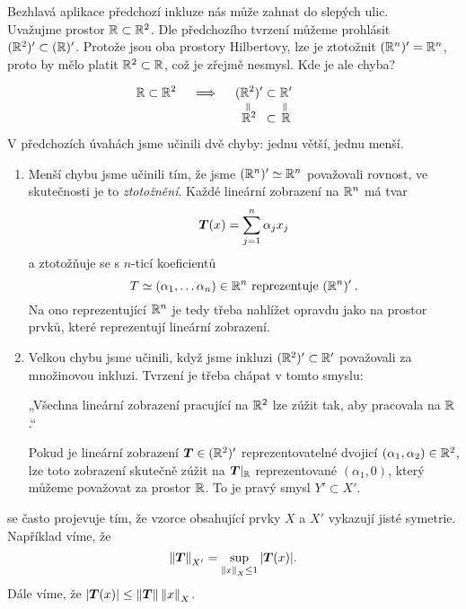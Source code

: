 \begin{example}
Bezhlavá aplikace předchozí inkluze nás může zahnat do slepých ulic.
\\
Uvažujme prostor $\mathbb{R} \subset \mathbb{R}^2$. Dle předchozího tvrzení můžeme prohlásit $(\mathbb{R}^2)' \subset (\mathbb{R})'$. Protože jsou oba prostory Hilbertovy, lze je ztotožnit $(\mathbb{R}^n)' = \mathbb{R}^n $, proto by mělo platit $\mathbb{R}^2 \subset \mathbb{R}$, což je zřejmě nesmysl. Kde je ale chyba?

\begin{align*}
    \hspace{-3em}
    \R \subset \R^2 \quad \implies \quad
    (\R^2)' &\subset \R' \\[-5pt]
    \mask{(\R^2)'}{\rotatebox[origin=c]{90}{=}} &\ph{\subset} \;\; \mask{\R'}{\rotatebox[origin=c]{90}{=}} \\[-5pt]\mask{(\R^2)'}{\R^2} &\subset \mask{\R'}{\R}
\end{align*}
V předchozích úvahách jsme učinili dvě chyby: jednu větší, ️jednu menší. \begin{enumerate}
    \item Menší chybu jsme učinili tím, že jsme $(\mathbb{R}^n)' \simeq \mathbb{R}^n$ považovali rovnost, ve skutečnosti je to \textit{ztotožnění}. Každé lineární zobrazení na $\mathbb{R}^n$ má tvar $$\boldsymbol{T}(x) = \sum_{j=1}^n \alpha_j x_j$$ a ztotožňuje se s $n$-ticí koeficientů $$T \simeq (\alpha_1, \dots \alpha_n) \in \mathbb{R}^n \text{ reprezentuje } (\mathbb{R}^n)' \: .$$ Na ono reprezentující $\mathbb{R}^n$ je tedy třeba nahlížet opravdu jako na prostor prvků, které reprezentují lineární zobrazení.
    \item Velkou chybu jsme učinili, když jsme inkluzi $(\mathbb{R}^2)' \subset \mathbb{R}'$ považovali za množinovou inkluzi. Tvrzení je třeba chápat v tomto smyslu:
    
    \begin{center}
    „Všechna lineární zobrazení pracující na $\mathbb{R}^2$ lze zúžit tak, aby pracovala na $\mathbb{R}$.“
    \end{center}
    
    Pokud je lineární zobrazení $\boldsymbol{T} \in (\mathbb{R}^2)'$ reprezentovatelné dvojicí $(\alpha_1, \alpha_2) \in \mathbb{R}^2$, lze toto zobrazení skutečně zúžit na $\boldsymbol{T}|_{\mathbb{R}}$ reprezentované $(\alpha_1, 0)$, který můžeme považovat za prostor $\mathbb{R}$. To je pravý smysl  $Y' \subset X'$.
\end{enumerate}
\end{example}

\bigskip

\begin{remark}
 se často projevuje tím, že vzorce obsahující prvky $X$ a $X'$ vykazují jisté symetrie. Například víme, že
$$\left\lVert\boldsymbol{T}\right\rVert_{X'} = \sup_{\left\lVert x\right\rVert_X \leq 1} |\boldsymbol{T}(x)|.$$
Dále víme, že $|\boldsymbol{T}(x)| \leq \left\lVert\boldsymbol{T}\right\rVert \left\lVert x\right\rVert_X$. 
\end{remark}


